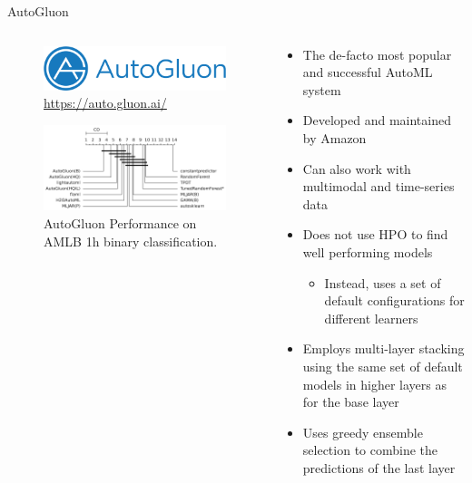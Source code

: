 \documentclass[11pt,compress,t,notes=noshow, xcolor=table]{beamer}
\begin{document}
\begin{vbframe}{AutoGluon}
\begin{columns}
    \begin{column}{0.4\textwidth}
        \vspace{-1em}
        \begin{figure}
            \centering
            \includegraphics[width=\textwidth]{figure/AG.png}
            \caption*{\url{https://auto.gluon.ai/}}
            \label{fig:auto_gluon}
        \end{figure}
        \vspace{1em}
        \begin{figure}
            \centering
            \includegraphics[width=\textwidth]{figure/ALMB.png}
            \caption{AutoGluon Performance on AMLB 1h binary classification.}
            \label{fig:auto_gluon_almb}
        \end{figure}
    \end{column}
    \begin{column}{0.6\textwidth}
        \begin{itemize}
            \item The de-facto most popular and successful AutoML system
            \item Developed and maintained by Amazon
            \item Can also work with multimodal and time-series data
            \item Does not use HPO to find well performing models
            \begin{itemize}
                \item Instead, uses a set of default configurations for different learners
            \end{itemize}
            \item Employs multi-layer stacking using the same set of default models in higher layers as for the base layer
            \item Uses greedy ensemble selection to combine the predictions of the last layer
        \end{itemize}
    \end{column}
\end{columns}
\end{vbframe}
\end{document}
